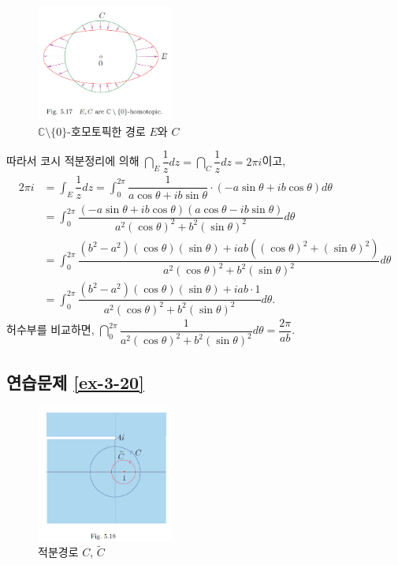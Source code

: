 \begin{figure}[h!]
\begin{center}
\includegraphics[width=0.4\textwidth]{./figs/fig-5-17}
\end{center}
\caption{$\mathbb C\setminus \{0\}$-호모토픽한 경로 $E$와 $C$}
\label{fig-5-17}
\end{figure}

따라서 코시 적분정리에 의해 $\dint_E \dfrac 1z dz = \dint_C \dfrac1z dz = 2\pi i$이고,
\begin{align*}
2\pi i &= \int_E \dfrac 1z dz = \int_0^{2\pi} \dfrac1{a\cos\theta +i b\sin\theta}
\cdot(-a\sin\theta + ib\cos\theta)d\theta \\
&= \int_0^{2\pi} \dfrac{(-a\sin\theta +ib\cos\theta)(a\cos\theta -ib\sin\theta)}
{a^2(\cos\theta)^2 + b^2(\sin\theta)^2}d\theta \\
&= \int_0^{2\pi} \dfrac{(b^2-a^2)(\cos\theta)(\sin\theta)+iab((\cos\theta)^2+(\sin\theta)^2)}
{a^2(\cos\theta)^2 + b^2(\sin\theta)^2}d\theta \\
&= \int_0^{2\pi} \dfrac{(b^2-a^2)(\cos\theta)(\sin\theta)+iab\cdot 1}
{a^2(\cos\theta)^2 + b^2(\sin\theta)^2}d\theta.
\end{align*}
허수부를 비교하면,
$\dint_0^{2\pi} \dfrac1{a^2(\cos\theta)^2 + b^2(\sin\theta)^2}d\theta = \dfrac{2\pi}{ab}$.

\subsection*{연습문제 \ref{ex-3-20}}

\begin{figure}[h!]
\begin{center}
\includegraphics[width=0.4\textwidth]{./figs/fig-5-18}
\end{center}
\caption{적분경로 $C$, $\tilde C$}
\label{fig-5-18}
\end{figure}

